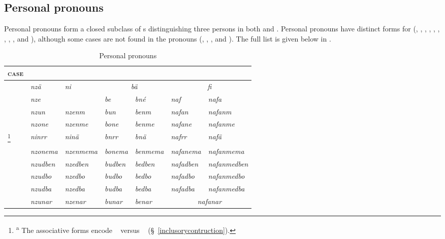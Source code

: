 \subsection{Personal pronouns} \label{personalpron}

Personal pronouns form a closed subclass of s distinguishing three persons in both  and  . Personal pronouns have distinct forms for  (, , , , , , , , , and ), although some cases are not found in the pronouns (, , , and ). The full list is given below in .

\begin{table}
\begin{tabularx}{\textwidth}{Xllllll}
	\lsptoprule
	\textsc{case}&\Fsg{}&\Fnsg{}&\Ssg{}&\Snsg{}&\Tsg{}&\Tnsg{}\\ 
	\hline
	\Abs{}&\multicolumn{1}{l|}{\emph{nzä}}&\multirow{2}{*}{\emph{ni}}&\multicolumn{2}{|c|}{\emph{bä}\hspace{.5cm}}&\multicolumn{2}{c|}{\emph{fi}}\rule{0pt}{3.5mm}\\\cline{4-5}\cline{6-7}
	\Erg{}&\multicolumn{1}{l|}{\emph{nze}}&&\multicolumn{1}{|l}{\emph{be}}&\emph{bné}&\emph{naf}&\emph{nafa}\\\cline{3-3}
	\Dat{}&\emph{nzun}&\emph{nzenm}&\emph{bun}&\emph{benm}&\emph{nafan}&\emph{nafanm}\\
	\Poss{}&\emph{nzone}&\emph{nzenme}&\emph{bone}&\emph{benme}&\emph{nafane}&\emph{nafanme}\\
	\Assoc{}\footnote{\textsuperscript{a} The associative forms encode \Du~ versus \Pl~ (\S~\ref{inclusorycontruction}).}&\emph{ninrr}&\emph{ninä}&\emph{bnrr}&\emph{bnä}&\emph{nafrr}&\emph{nafä}\\
	\Char{}&\emph{nzonema}&\emph{nzenmema}&\emph{bonema}&\emph{benmema}&\emph{nafanema}&\emph{nafanmema}\\
	\Loc{}&\emph{nzudben}&\emph{nzedben}&\emph{budben}&\emph{bedben}&\emph{nafadben}&\emph{nafanmedben}\\
	\All{}&\emph{nzudbo}&\emph{nzedbo}&\emph{budbo}&\emph{bedbo}&\emph{nafadbo}&\emph{nafanmedbo}\\
	\Abl{}&\emph{nzudba}&\emph{nzedba}&\emph{budba}&\emph{bedba}&\emph{nafadba}&\emph{nafanmedba}\\\cline{6-7}
	\Purp{}&\emph{nzunar}&\emph{nzenar}&\emph{bunar}&\emph{benar}&\multicolumn{2}{|c|}{\emph{nafanar}}\rule{0pt}{3.5mm}\\
	\hline 
	\bottomrule 
\end{tabularx}
\caption{Personal pronouns}
\label{perspron}
\end{table}


